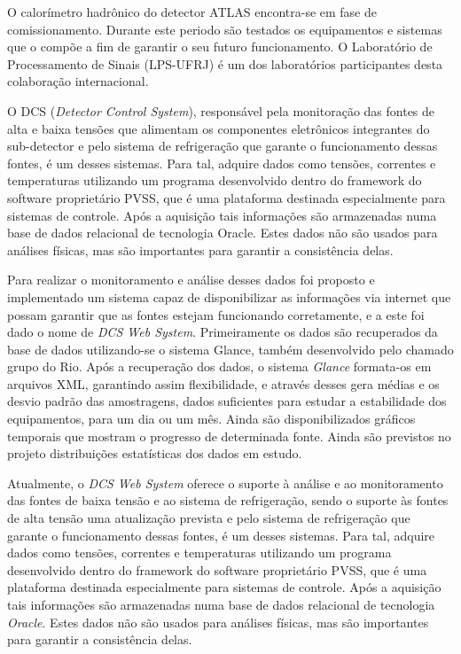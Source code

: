\begin{itemize}
O calorímetro hadrônico  do detector ATLAS encontra-se em fase de
comissionamento. Durante este periodo são testados os equipamentos e sistemas
que o compõe a fim de garantir o seu futuro funcionamento. O Laboratório de
Processamento de Sinais (LPS-UFRJ) é um dos laboratórios participantes desta
colaboração internacional.

O DCS (\emph{Detector Control System}), responsável pela monitoração das fontes
de alta e baixa tensões que alimentam os componentes eletrônicos integrantes do
sub-detector e pelo sistema de refrigeração que garante o funcionamento dessas
fontes, é um desses sistemas. Para tal, adquire dados como tensões, correntes e
temperaturas utilizando um programa  desenvolvido dentro do framework do
software proprietário PVSS, que é uma plataforma destinada especialmente para
sistemas de controle.  Após a aquisição tais informações são armazenadas numa
base de dados relacional de tecnologia Oracle. Estes dados não são usados para
análises físicas, mas são importantes para garantir a consistência delas.

Para realizar o monitoramento e análise desses dados foi proposto e
implementado um sistema capaz de disponibilizar as informações via internet que
possam garantir que as fontes estejam funcionando corretamente, e a este foi
dado o nome de \emph{DCS Web System}. Primeiramente os dados são recuperados da
base de dados utilizando-se o sistema Glance, também desenvolvido pelo chamado
grupo do Rio.  Após a recuperação dos dados, o sistema \emph{Glance} formata-os
em arquivos XML, garantindo assim flexibilidade, e através desses gera médias e
os desvio padrão das amostragens, dados suficientes para estudar a estabilidade
dos equipamentos, para um dia ou um mês. Ainda são disponibilizados gráficos
temporais que mostram o progresso de determinada fonte. Ainda são previstos no
projeto distribuições estatísticas dos dados em estudo.

Atualmente, o \emph{DCS Web System} oferece o suporte à análise e ao
monitoramento das fontes de baixa tensão e ao sistema de refrigeração, sendo o
suporte às fontes de alta tensão uma atualização prevista e pelo sistema de
refrigeração que garante o funcionamento dessas fontes, é um desses sistemas.
Para tal, adquire dados como tensões, correntes e temperaturas utilizando um
programa  desenvolvido dentro do framework do software proprietário PVSS, que é
uma plataforma destinada especialmente para sistemas de controle.  Após a
aquisição tais informações são armazenadas numa base de dados relacional de
tecnologia \emph{Oracle}. Estes dados não são usados para análises físicas, mas
são importantes para garantir a consistência delas.


\end{itemize}
